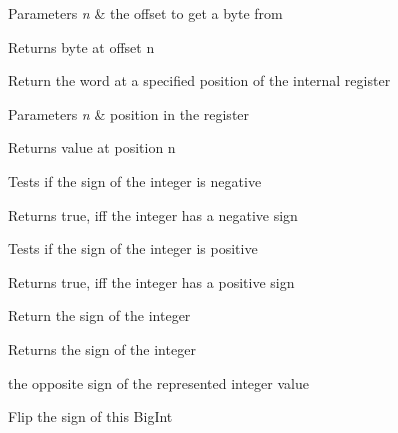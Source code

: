 \begin{DoxyParams}{Parameters}
{\em n} & the offset to get a byte from \\
\hline
\end{DoxyParams}
\begin{DoxyReturn}{Returns}
byte at offset n
\end{DoxyReturn}
Return the word at a specified position of the internal register 
\begin{DoxyParams}{Parameters}
{\em n} & position in the register \\
\hline
\end{DoxyParams}
\begin{DoxyReturn}{Returns}
value at position n
\end{DoxyReturn}
Tests if the sign of the integer is negative \begin{DoxyReturn}{Returns}
true, iff the integer has a negative sign
\end{DoxyReturn}
Tests if the sign of the integer is positive \begin{DoxyReturn}{Returns}
true, iff the integer has a positive sign
\end{DoxyReturn}
Return the sign of the integer \begin{DoxyReturn}{Returns}
the sign of the integer

the opposite sign of the represented integer value
\end{DoxyReturn}
Flip the sign of this Big\+Int

